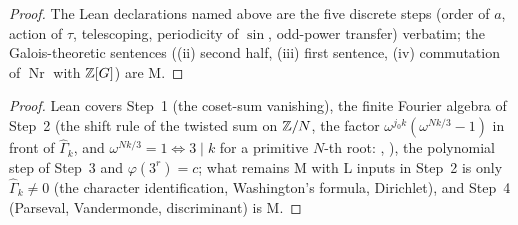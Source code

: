 \begin{proof}\leanok

The Lean declarations named above are the five discrete steps (order of $a$, action of $\tau$, telescoping, periodicity of $\sin$, odd-power transfer) verbatim; the Galois-theoretic sentences ((ii) second half, (iii) first sentence, (iv) commutation of $\operatorname{Nr}$ with $\mathbb{Z}[G]$) are M.
\end{proof}
\begin{lemma}\label{lem:disc}

\end{lemma}
\par{}\par
\begin{theorem}\label{thm:rank3}

\end{theorem}
\par{}\par
\begin{proof}

Lean covers Step~1 (the coset-sum vanishing), the finite Fourier algebra of Step~2 (the shift rule of the twisted sum on $\mathbb{Z}/N$, the factor $\omega^{j_0k}(\omega^{Nk/3}-1)$ in front of $\hat\Gamma_k$, and $\omega^{Nk/3}=1\iff3\mid k$ for a primitive $N$-th root: , ), the polynomial step of Step~3 and $\varphi(3^r)=c$; what remains M with L inputs in Step~2 is only $\hat\Gamma_k\ne0$ (the character identification, Washington's formula, Dirichlet), and Step~4 (Parseval, Vandermonde, discriminant) is M.
\end{proof}
